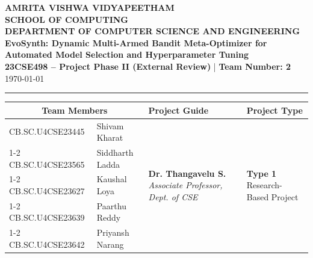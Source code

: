 \documentclass[11pt, a4paper]{article}
\begin{document}
\noindent
\begin{minipage}{\textwidth}
    \centering
    {\Large \textbf{\textcolor{amritaMaroon}{
    AMRITA VISHWA VIDYAPEETHAM \\
    SCHOOL OF COMPUTING \\
    DEPARTMENT OF COMPUTER SCIENCE AND ENGINEERING \\
    }}}
    \vspace{0.2cm}
    {\large \textbf{EvoSynth: Dynamic Multi-Armed Bandit Meta-Optimizer for Automated Model Selection and Hyperparameter Tuning}} \\[0.1cm]
    \textbf{23CSE498 -- Project Phase II (External Review)} \quad | \quad \textbf{Team Number: 2} \\
    \today
\end{minipage}

\vspace{0.3cm}
\hrule
\vspace{0.3cm}

\noindent
\begin{center}
    \renewcommand{\arraystretch}{1.35}
    \setlength{\tabcolsep}{6pt}
    \begin{tabular}{|l|p{4.8cm}|p{4.6cm}|p{3.2cm}|}
        \hline
        \multicolumn{2}{|c|}{\textbf{Team Members}} & \textbf{Project Guide} & \textbf{Project Type} \\
        \hline
        \small CB.SC.U4CSE23445 & \small \raggedright Shivam Kharat &
        \multirow{5}{=}{\raggedright \small \textbf{Dr. Thangavelu S.} \newline \textit{Associate Professor, \newline Dept. of CSE}} &
        \multirow{5}{=}{\raggedright \small \textbf{Type 1} \newline Research-Based Project} \\ \cline{1-2}
        \small CB.SC.U4CSE23565 & \small Siddharth Ladda & & \\ \cline{1-2}
        \small CB.SC.U4CSE23627 & \small Kaushal Loya & & \\ \cline{1-2}
        \small CB.SC.U4CSE23639 & \small Paarthu Reddy & & \\ \cline{1-2}
        \small CB.SC.U4CSE23642 & \small Priyansh Narang & & \\
        \hline
    \end{tabular}
\end{center}
\vspace{0.2cm}
\end{document}
